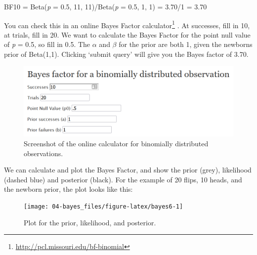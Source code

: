 \documentclass[
  oneside]{krantz}
\renewcommand{\href}[2]{#2\footnote{\url{#1}}}
\begin{document}
BF10 = Beta(\emph{p} = 0.5, 11, 11)/Beta(\emph{p} = 0.5, 1, 1) = 3.70/1 = 3.70

You can check this in an \href{http://pcl.missouri.edu/bf-binomial}{online Bayes Factor calculator} \citep{rouder_bayesian_2009}. At successes, fill in 10, at trials, fill in 20. We want to calculate the Bayes Factor for the point null value of \emph{p} = 0.5, so fill in 0.5. The \(\alpha\) and \(\beta\) for the prior are both 1, given the newborns prior of Beta(1,1). Clicking `submit query' will give you the Bayes factor of 3.70.



\begin{figure}

{\centering \includegraphics[width=1\linewidth]{images/binombayesonline} 

}

\caption{Screenshot of the online calculator for binomially distributed observations.}\label{fig:gpower-screenshot-bayes}
\end{figure}

We can calculate and plot the Bayes Factor, and show the prior (grey), likelihood (dashed blue) and posterior (black). For the example of 20 flips, 10 heads, and the newborn prior, the plot looks like this:



\begin{figure}

{\centering \texttt{[image: 04-bayes\_files/figure-latex/bayes6-1]} 

}

\caption{Plot for the prior, likelihood, and posterior.}\label{fig:bayes6}
\end{figure}
\end{document}
